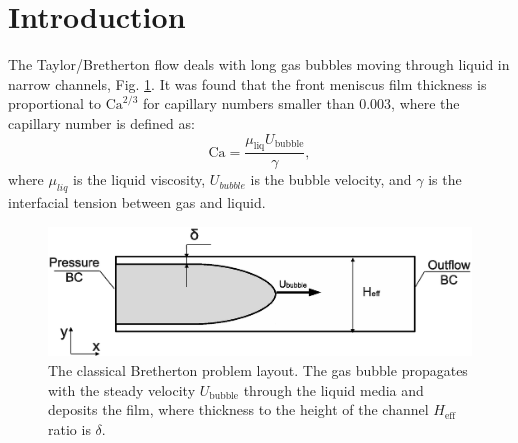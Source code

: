 \documentclass[preprint,12pt]{elsarticle}
\newcommand{\Ca}{\mathrm{Ca}}
\begin{document}
\linenumbers





\section{Introduction}
The Taylor/Bretherton \cite{bretherton} flow deals with long gas bubbles moving through liquid in
narrow channels, Fig. \ref{fig:classical:bretherton}. It was found that the front meniscus film
thickness is proportional
to $\Ca^{2/3}$ for capillary numbers smaller than $0.003$, where the capillary number is defined as:
\begin{equation}
\label{capillary:number:definition}
\Ca=\frac{\mu_\mathrm{liq} U_\mathrm{bubble}}{\gamma},
\end{equation}
where $\mu_{liq}$ is the liquid viscosity, $U_{bubble}$ is the bubble velocity, and
$\gamma$ is the interfacial tension between gas and liquid.
\begin{figure}
\includegraphics[width=\textwidth]{Figures/benchmark_bretherton.eps}
\caption{The classical Bretherton problem layout. The gas bubble
propagates with the steady velocity $U_{\mathrm{bubble}}$ through the liquid media and deposits
the film, where thickness to the height of the channel $H_{\mathrm{eff}}$ ratio is 
$\delta$.\label{fig:classical:bretherton}} 
\end{figure}
\end{document}
